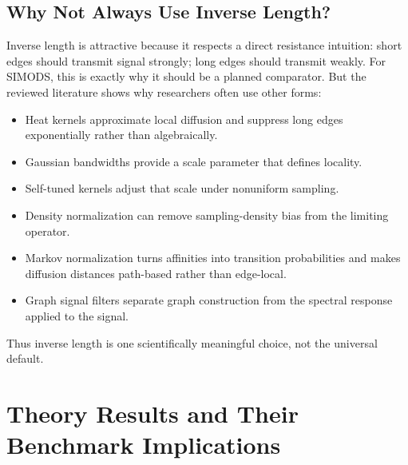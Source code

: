 \documentclass[11pt]{article}
\begin{document}
\subsection{Why Not Always Use Inverse Length?}

Inverse length is attractive because it respects a direct resistance intuition:
short edges should transmit signal strongly; long edges should transmit weakly.
For SIMODS, this is exactly why it should be a planned comparator.  But the
reviewed literature shows why researchers often use other forms:

\begin{itemize}
  \item Heat kernels approximate local diffusion and suppress long edges
    exponentially rather than algebraically.
  \item Gaussian bandwidths provide a scale parameter that defines locality.
  \item Self-tuned kernels adjust that scale under nonuniform sampling.
  \item Density normalization can remove sampling-density bias from the
    limiting operator.
  \item Markov normalization turns affinities into transition probabilities
    and makes diffusion distances path-based rather than edge-local.
  \item Graph signal filters separate graph construction from the spectral
    response applied to the signal.
\end{itemize}

Thus inverse length is one scientifically meaningful choice, not the universal
default.

\section{Theory Results and Their Benchmark Implications}
\end{document}
